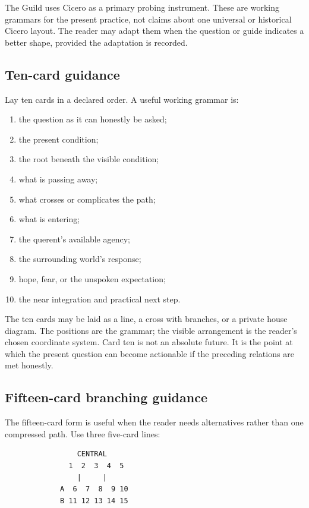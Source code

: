 The Guild uses Cicero as a primary probing instrument. These are working
grammars for the present practice, not claims about one universal or historical
Cicero layout. The reader may adapt them when the question or guide indicates a
better shape, provided the adaptation is recorded.

\subsection{Ten-card guidance}

Lay ten cards in a declared order. A useful working grammar is:

\begin{enumerate}
\item the question as it can honestly be asked;
\item the present condition;
\item the root beneath the visible condition;
\item what is passing away;
\item what crosses or complicates the path;
\item what is entering;
\item the querent's available agency;
\item the surrounding world's response;
\item hope, fear, or the unspoken expectation;
\item the near integration and practical next step.
\end{enumerate}

The ten cards may be laid as a line, a cross with branches, or a private house
diagram. The positions are the grammar; the visible arrangement is the reader's
chosen coordinate system. Card ten is not an absolute future. It is the point at
which the present question can become actionable if the preceding relations are
met honestly.

\subsection{Fifteen-card branching guidance}

The fifteen-card form is useful when the reader needs alternatives rather than
one compressed path. Use three five-card lines:

\begin{verbatim}
                 CENTRAL
               1  2  3  4  5
                 |     |
             A  6  7  8  9 10
             B 11 12 13 14 15
\end{verbatim}

